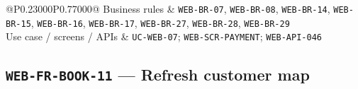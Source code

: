\begin{longtable}{@{}P{0.23000\SRSWidth}P{0.77000\SRSWidth}@{}}
Business rules & \texttt{WEB-\allowbreak{}BR-\allowbreak{}07}, \texttt{WEB-\allowbreak{}BR-\allowbreak{}08}, \texttt{WEB-\allowbreak{}BR-\allowbreak{}14}, \texttt{WEB-\allowbreak{}BR-\allowbreak{}15}, \texttt{WEB-\allowbreak{}BR-\allowbreak{}16}, \texttt{WEB-\allowbreak{}BR-\allowbreak{}17}, \texttt{WEB-\allowbreak{}BR-\allowbreak{}27}, \texttt{WEB-\allowbreak{}BR-\allowbreak{}28}, \texttt{WEB-\allowbreak{}BR-\allowbreak{}29} \\[3pt]
Use case /\allowbreak{} screens /\allowbreak{} APIs & \texttt{UC-\allowbreak{}WEB-\allowbreak{}07}; \texttt{WEB-\allowbreak{}SCR-\allowbreak{}PAYMENT}; \texttt{WEB-\allowbreak{}API-\allowbreak{}046} \\[3pt]
\end{longtable}
\endgroup

\subsection{\texttt{WEB-\allowbreak{}FR-\allowbreak{}BOOK-\allowbreak{}11} — Refresh customer map}
\begingroup
\fontsize{9.5}{12}\selectfont
\setlength{\SRSWidth}{\dimexpr\linewidth-2\tabcolsep\relax}
